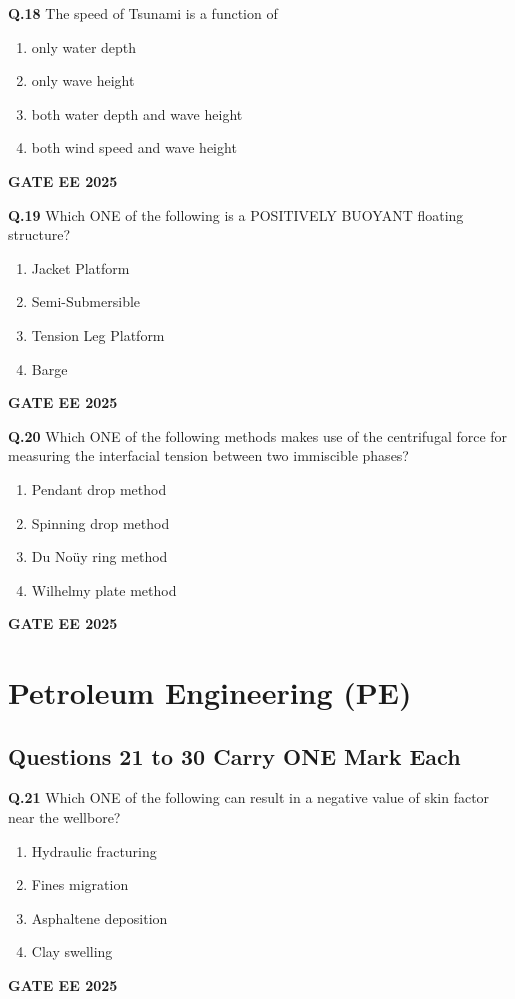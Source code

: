 \documentclass{article}
\begin{document}
\vspace{0.5cm}

\textbf{Q.18} The speed of Tsunami is a function of
\begin{enumerate}[label=(\Alph*)]
    \item only water depth
    \item only wave height
    \item both water depth and wave height
    \item both wind speed and wave height
\end{enumerate}
\textbf{GATE EE 2025}

\vspace{0.5cm}

\textbf{Q.19} Which ONE of the following is a POSITIVELY BUOYANT floating structure?
\begin{enumerate}[label=(\Alph*)]
    \item Jacket Platform
    \item Semi-Submersible
    \item Tension Leg Platform
    \item Barge
\end{enumerate}
\textbf{GATE EE 2025}

\vspace{0.5cm}

\textbf{Q.20} Which ONE of the following methods makes use of the centrifugal force for measuring the interfacial tension between two immiscible phases?
\begin{enumerate}[label=(\Alph*)]
    \item Pendant drop method
    \item Spinning drop method
    \item Du Noüy ring method
    \item Wilhelmy plate method
\end{enumerate}
\textbf{GATE EE 2025}

\vspace{0.5cm}

\section*{Petroleum Engineering (PE)}

\subsection*{Questions 21 to 30 Carry ONE Mark Each}

\textbf{Q.21} Which ONE of the following can result in a negative value of skin factor near the wellbore?
\begin{enumerate}[label=(\Alph*)]
    \item Hydraulic fracturing
    \item Fines migration
    \item Asphaltene deposition
    \item Clay swelling
\end{enumerate}
\textbf{GATE EE 2025}
\end{document}
